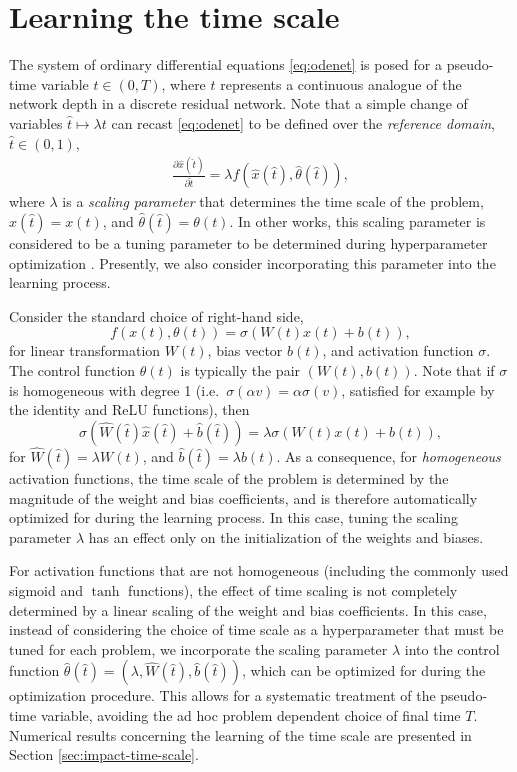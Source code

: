 \documentclass[12pt]{amsart}
\begin{document}
\section{Learning the time scale}

\def\tref{\hat{t}}
\def\xref{\hat{x}}
\def\thref{\hat{\theta}}

The system of ordinary differential equations \eqref{eq:odenet} is posed for a pseudo-time variable $t \in (0,T)$, where $t$ represents a continuous analogue of the network depth in a discrete residual network.
Note that a simple change of variables $\tref \mapsto \lambda t$ can recast \eqref{eq:odenet} to be defined over the \textit{reference domain}, $\tref \in (0,1)$,
\begin{align} \label{eq:odenet_refdomain}
    \frac{\partial \xref(\tref)}{\partial\tref} = \lambda f(\xref(\tref), \thref(\tref)),
\end{align}
where $\lambda$ is a \textit{scaling parameter} that determines the time scale of the problem, $\xref(\tref) = x(t)$, and $\thref(\tref) = \theta(t)$.
In other works, this scaling parameter is considered to be a tuning parameter to be determined during hyperparameter optimization \cite{queiruga2020continuous}.
Presently, we also consider incorporating this parameter into the learning process.

Consider the standard choice of right-hand side,
\[
    f(x(t), \theta(t)) = \sigma(W(t)x(t) + b(t)),
\]
for linear transformation $W(t)$, bias vector $b(t)$, and activation function $\sigma$.
The control function $\theta(t)$ is typically the pair $(W(t),b(t))$.
Note that if $\sigma$ is homogeneous with degree 1 (i.e.\ $\sigma(\alpha v) = \alpha \sigma(v)$, satisfied for example by the identity and ReLU functions), then
\[
    \sigma(\hat{W}(\tref)\xref(\tref) + \hat{b}(\tref))
    = \lambda \sigma(W(t)x(t) + b(t)),
\]
for $\hat{W}(\tref) = \lambda W(t)$, and $\hat{b}(\tref) = \lambda b(t)$.
As a consequence, for \textit{homogeneous} activation functions, the time scale of the problem is determined by the magnitude of the weight and bias coefficients, and is therefore automatically optimized for during the learning process.
In this case, tuning the scaling parameter $\lambda$ has an effect only on the initialization of the weights and biases.

For activation functions that are not homogeneous (including the commonly used sigmoid and $\tanh$ functions), the effect of time scaling is not completely determined by a linear scaling of the weight and bias coefficients.
In this case, instead of considering the choice of time scale as a hyperparameter that must be tuned for each problem, we incorporate the scaling parameter $\lambda$ into the control function $\thref(\tref) = (\lambda, \hat{W}(\tref), \hat{b}(\tref))$, which can be optimized for during the optimization procedure.
This allows for a systematic treatment of the pseudo-time variable, avoiding the ad hoc problem dependent choice of final time $T$.
Numerical results concerning the learning of the time scale are presented in Section \ref{sec:impact-time-scale}.
\end{document}
